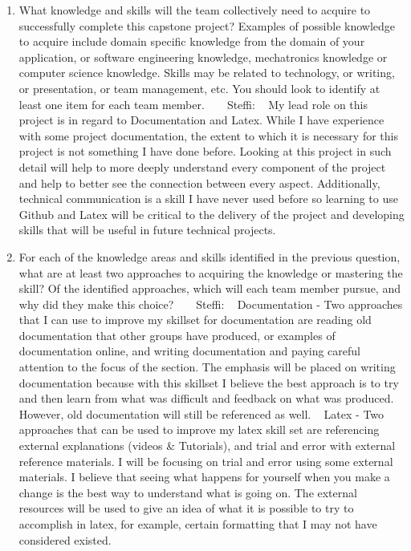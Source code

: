 \documentclass[12pt]{article}
\begin{document}
\begin{enumerate}
  \item What knowledge and skills will the team collectively need to acquire to
  successfully complete this capstone project?  Examples of possible knowledge
  to acquire include domain specific knowledge from the domain of your
  application, or software engineering knowledge, mechatronics knowledge or
  computer science knowledge.  Skills may be related to technology, or writing,
  or presentation, or team management, etc.  You should look to identify at
  least one item for each team member.
  ~\newline
  ~\newline
 Steffi: 
  ~\newline
My lead role on this project is in regard to Documentation and Latex.  While I have experience with some project documentation, the extent to which it is necessary for this project is not something I have done before.  Looking at this project in such detail will help to more deeply understand every component of the project and help to better see the connection between every aspect.  Additionally, technical communication is a skill I have never used before so learning to use Github and Latex will be critical to the delivery of the project and developing skills that will be useful in future technical projects. 
  
  \item For each of the knowledge areas and skills identified in the previous
  question, what are at least two approaches to acquiring the knowledge or
  mastering the skill?  Of the identified approaches, which will each team
  member pursue, and why did they make this choice?
    ~\newline
    ~\newline
Steffi: 
  ~\newline
 Documentation - Two approaches that I can use to improve my skillset for documentation are reading old documentation that other groups have produced, or examples of documentation online, and writing documentation and paying careful attention to the focus of the section.  The emphasis will be placed on writing documentation because with this skillset I believe the best approach is to try and then learn from what was difficult and feedback on what was produced.  However, old documentation will still be referenced as well. 
  ~\newline
  Latex - Two approaches that can be used to improve my latex skill set are referencing external explanations (videos \& Tutorials), and trial and error with external reference materials.  I will be focusing on trial and error using some external materials.  I believe that seeing what happens for yourself when you make a change is the best way to understand what is going on.  The external resources will be used to give an idea of what it is possible to try to accomplish in latex, for example, certain formatting that I may not have considered existed. 
  
\end{enumerate}
\end{document}
